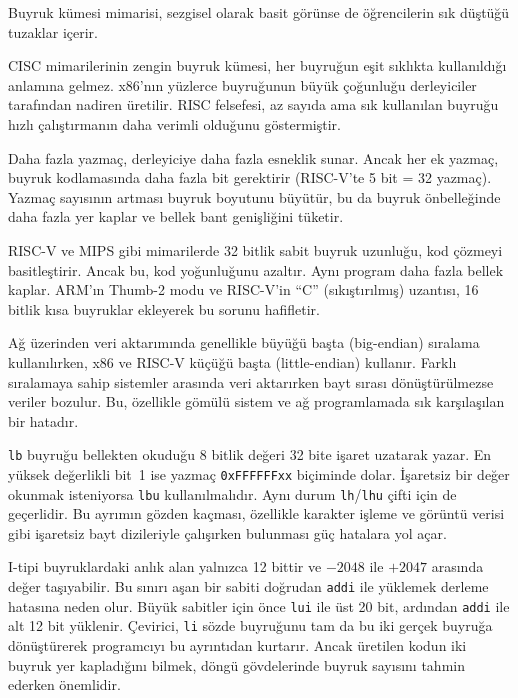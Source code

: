 Buyruk kümesi mimarisi, sezgisel olarak basit görünse de öğrencilerin sık düştüğü tuzaklar içerir.

CISC mimarilerinin zengin buyruk kümesi, her buyruğun eşit sıklıkta kullanıldığı anlamına gelmez. x86'nın yüzlerce buyruğunun büyük çoğunluğu derleyiciler tarafından nadiren üretilir. RISC felsefesi, az sayıda ama sık kullanılan buyruğu hızlı çalıştırmanın daha verimli olduğunu göstermiştir.

Daha fazla yazmaç, derleyiciye daha fazla esneklik sunar. Ancak her ek yazmaç, buyruk kodlamasında daha fazla bit gerektirir (RISC-V'te 5 bit = 32 yazmaç). Yazmaç sayısının artması buyruk boyutunu büyütür, bu da buyruk önbelleğinde daha fazla yer kaplar ve bellek bant genişliğini tüketir.

RISC-V ve MIPS gibi mimarilerde 32 bitlik sabit buyruk uzunluğu, kod çözmeyi basitleştirir. Ancak bu, kod yoğunluğunu azaltır. Aynı program daha fazla bellek kaplar. ARM'ın Thumb-2 modu ve RISC-V'in ``C'' (sıkıştırılmış) uzantısı, 16 bitlik kısa buyruklar ekleyerek bu sorunu hafifletir.

Ağ üzerinden veri aktarımında genellikle büyüğü başta (big-endian) sıralama kullanılırken, x86 ve RISC-V küçüğü başta (little-endian) kullanır. Farklı sıralamaya sahip sistemler arasında veri aktarırken bayt sırası dönüştürülmezse veriler bozulur. Bu, özellikle gömülü sistem ve ağ programlamada sık karşılaşılan bir hatadır.

\texttt{lb} buyruğu bellekten okuduğu 8 bitlik değeri 32 bite işaret uzatarak yazar. En yüksek değerlikli bit~1 ise yazmaç \texttt{0xFFFFFFxx} biçiminde dolar. İşaretsiz bir değer okunmak isteniyorsa \texttt{lbu} kullanılmalıdır. Aynı durum \texttt{lh}/\texttt{lhu} çifti için de geçerlidir. Bu ayrımın gözden kaçması, özellikle karakter işleme ve görüntü verisi gibi işaretsiz bayt dizileriyle çalışırken bulunması güç hatalara yol açar.

I-tipi buyruklardaki anlık alan yalnızca 12 bittir ve $-2048$ ile $+2047$ arasında değer taşıyabilir. Bu sınırı aşan bir sabiti doğrudan \texttt{addi} ile yüklemek derleme hatasına neden olur. Büyük sabitler için önce \texttt{lui} ile üst 20 bit, ardından \texttt{addi} ile alt 12 bit yüklenir. Çevirici, \texttt{li} sözde buyruğunu tam da bu iki gerçek buyruğa dönüştürerek programcıyı bu ayrıntıdan kurtarır. Ancak üretilen kodun iki buyruk yer kapladığını bilmek, döngü gövdelerinde buyruk sayısını tahmin ederken önemlidir.

